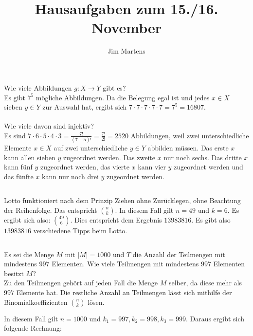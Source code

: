\documentclass[10pt,a4paper,oneside,ngerman,numbers=noenddot]{scrartcl}
\begin{document}
\author{Jim Martens}
\title{Hausaufgaben zum 15./16. November}
\maketitle
\section{} %
\subsection{} %
Wie viele Abbildungen $g: X \rightarrow Y$ gibt es?\\
Es gibt $7^{5}$ mögliche Abbildungen. Da die Belegung egal ist und jedes $x \in X$ sieben $y \in Y$ zur Auswahl hat, ergibt sich $7 \cdot 7 \cdot 7 \cdot 7 \cdot 7 = 7^{5}=16807$.\\\\
Wie viele davon sind injektiv?\\
Es sind $7 \cdot 6 \cdot 5 \cdot 4 \cdot 3=\frac{7!}{(7-5)!}=\frac{7!}{2!}=2520$ Abbildungen, weil zwei unterschiedliche Elemente $x \in X$ auf zwei unterschiedliche $y \in Y$ abbilden müssen. Das erste $x$ kann allen sieben $y$ zugeordnet werden. Das zweite $x$ nur noch sechs. Das dritte $x$ kann fünf $y$ zugeordnet werden, das vierte $x$ kann vier $y$ zugeordnet werden und das fünfte $x$ kann nur noch drei $y$ zugeordnet werden.
\subsection{} %
Lotto funktioniert nach dem Prinzip Ziehen ohne Zurücklegen, ohne Beachtung der Reihenfolge. 
Das entspricht $\binom{n}{k}$. In diesem Fall gilt $n=49$ und $k=6$. Es ergibt sich also: $\binom{49}{6}$. Dies entspricht dem Ergebnis $13983816$.
Es gibt also $13983816$ verschiedene Tipps beim Lotto.
\subsection{} %
Es sei die Menge $M$ mit $|M| = 1000$ und $T$ die Anzahl der Teilmengen mit mindestens $997$ Elementen. Wie viele Teilmengen mit mindestens $997$ Elementen besitzt $M$?\\
Zu den Teilmengen gehört auf jeden Fall die Menge $M$ selber, da diese mehr als $997$ Elemente hat. Die restliche Anzahl an Teilmengen lässt sich mithilfe der Binomialkoeffizienten $\binom{n}{k}$ lösen.

In diesem Fall gilt $n=1000$ und $k_{1}=997,k_{2}=998,k_{3}=999$. Daraus ergibt sich folgende Rechnung:
\end{document}
